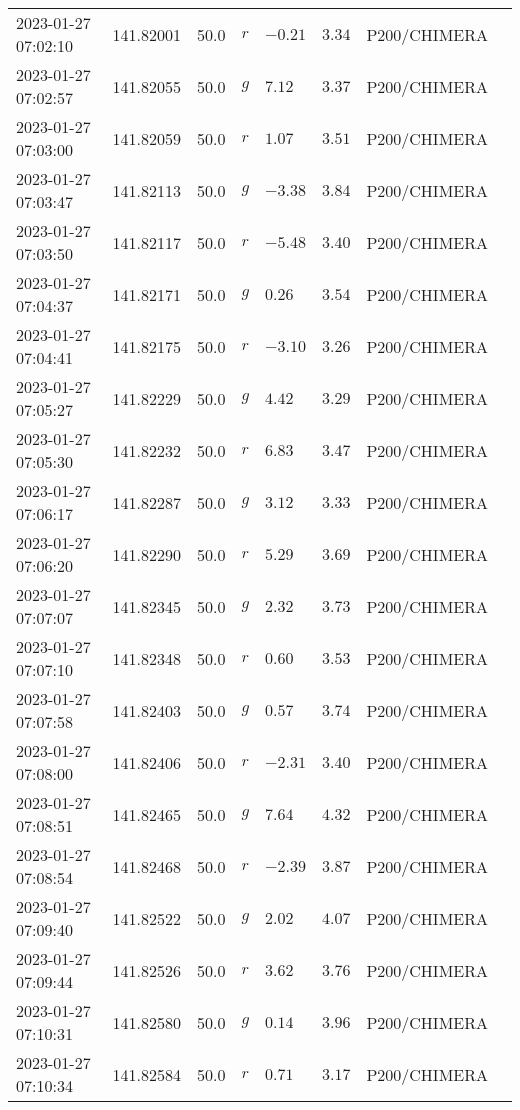 \documentclass{nature_plusfigure}
\begin{document}
\begin{supplement}
\begin{center}
\begin{longtable}{llllllll}
2023-01-27 07:02:10 & 141.82001 & 50.0 & $r$ & $-0.21$ & $3.34$ & P200/CHIMERA &  \\ 
2023-01-27 07:02:57 & 141.82055 & 50.0 & $g$ & $7.12$ & $3.37$ & P200/CHIMERA &  \\ 
2023-01-27 07:03:00 & 141.82059 & 50.0 & $r$ & $1.07$ & $3.51$ & P200/CHIMERA &  \\ 
2023-01-27 07:03:47 & 141.82113 & 50.0 & $g$ & $-3.38$ & $3.84$ & P200/CHIMERA &  \\ 
2023-01-27 07:03:50 & 141.82117 & 50.0 & $r$ & $-5.48$ & $3.40$ & P200/CHIMERA &  \\ 
2023-01-27 07:04:37 & 141.82171 & 50.0 & $g$ & $0.26$ & $3.54$ & P200/CHIMERA &  \\ 
2023-01-27 07:04:41 & 141.82175 & 50.0 & $r$ & $-3.10$ & $3.26$ & P200/CHIMERA &  \\ 
2023-01-27 07:05:27 & 141.82229 & 50.0 & $g$ & $4.42$ & $3.29$ & P200/CHIMERA &  \\ 
2023-01-27 07:05:30 & 141.82232 & 50.0 & $r$ & $6.83$ & $3.47$ & P200/CHIMERA &  \\ 
2023-01-27 07:06:17 & 141.82287 & 50.0 & $g$ & $3.12$ & $3.33$ & P200/CHIMERA &  \\ 
2023-01-27 07:06:20 & 141.82290 & 50.0 & $r$ & $5.29$ & $3.69$ & P200/CHIMERA &  \\ 
2023-01-27 07:07:07 & 141.82345 & 50.0 & $g$ & $2.32$ & $3.73$ & P200/CHIMERA &  \\ 
2023-01-27 07:07:10 & 141.82348 & 50.0 & $r$ & $0.60$ & $3.53$ & P200/CHIMERA &  \\ 
2023-01-27 07:07:58 & 141.82403 & 50.0 & $g$ & $0.57$ & $3.74$ & P200/CHIMERA &  \\ 
2023-01-27 07:08:00 & 141.82406 & 50.0 & $r$ & $-2.31$ & $3.40$ & P200/CHIMERA &  \\ 
2023-01-27 07:08:51 & 141.82465 & 50.0 & $g$ & $7.64$ & $4.32$ & P200/CHIMERA &  \\ 
2023-01-27 07:08:54 & 141.82468 & 50.0 & $r$ & $-2.39$ & $3.87$ & P200/CHIMERA &  \\ 
2023-01-27 07:09:40 & 141.82522 & 50.0 & $g$ & $2.02$ & $4.07$ & P200/CHIMERA &  \\ 
2023-01-27 07:09:44 & 141.82526 & 50.0 & $r$ & $3.62$ & $3.76$ & P200/CHIMERA &  \\ 
2023-01-27 07:10:31 & 141.82580 & 50.0 & $g$ & $0.14$ & $3.96$ & P200/CHIMERA &  \\ 
2023-01-27 07:10:34 & 141.82584 & 50.0 & $r$ & $0.71$ & $3.17$ & P200/CHIMERA &  \\ 

\end{longtable}
\end{center}
\end{supplement}
\end{document}
